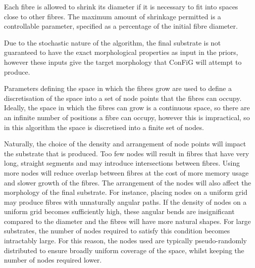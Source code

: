 Each fibre is allowed to shrink its diameter if it is necessary to fit into spaces close to other fibres.
The maximum amount of shrinkage permitted is a controllable parameter, specified as a percentage of the initial fibre diameter.

Due to the stochastic nature of the algorithm, the final substrate is not guaranteed to have the exact morphological properties as input in the priors, however these inputs give the target morphology that ConFiG will attempt to produce.



Parameters defining the space in which the fibres grow are used to define a discretisation of the space into a set of node points that the fibres can occupy. Ideally, the space in which the fibres can grow is a continuous space, so there are an infinite number of positions a fibre can occupy, however this is impractical, so in this algorithm the space is discretised into a finite set of nodes.

Naturally, the choice of the density and arrangement of node points will impact the substrate that is produced. Too few nodes will result in fibres that have very long, straight segments and may introduce intersections between fibres. Using more nodes will reduce overlap between fibres at the cost of more memory usage and slower growth of the fibres.
The arrangement of the nodes will also affect the morphology of the final substrate. For instance, placing nodes on a uniform grid may produce fibres with unnaturally angular paths. If the density of nodes on a uniform grid becomes sufficiently high, these angular bends are insignificant compared to the diameter and the fibres will have more natural shapes. For large substrates, the number of nodes required to satisfy this condition becomes intractably large. For this reason, the nodes used are typically pseudo-randomly distributed to ensure broadly uniform coverage of the space, whilst keeping the number of nodes required lower.

